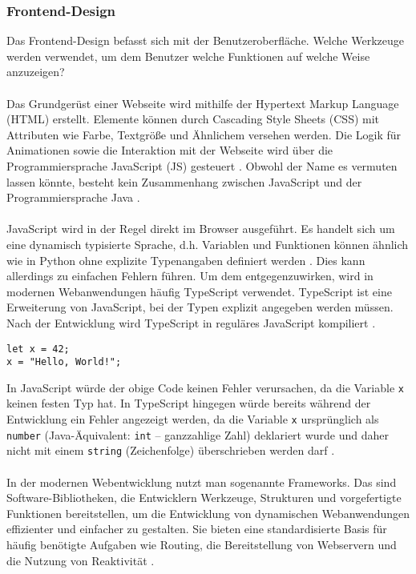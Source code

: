 \subsubsection{Frontend-Design}
Das Frontend-Design befasst sich mit der Benutzeroberfläche. Welche Werkzeuge werden verwendet, um dem Benutzer welche Funktionen auf welche Weise anzuzeigen? \parencite{mccartney-2024}\\\\
Das Grundgerüst einer Webseite wird mithilfe der Hypertext Markup Language (HTML) erstellt. Elemente können durch Cascading Style Sheets (CSS) mit Attributen wie Farbe, Textgröße und Ähnlichem versehen werden. Die Logik für Animationen sowie die Interaktion mit der Webseite wird über die Programmiersprache JavaScript (JS) gesteuert \parencite{mdn-getting-started-web}. Obwohl der Name es vermuten lassen könnte, besteht kein Zusammenhang zwischen JavaScript und der Programmiersprache Java \parencite{geeksforgeeks-2024}.\\\\
JavaScript wird in der Regel direkt im Browser ausgeführt. Es handelt sich um eine dynamisch typisierte Sprache, d.h. Variablen und Funktionen können ähnlich wie in Python ohne explizite Typenangaben definiert werden \parencite{mdn-javascript}. Dies kann allerdings zu einfachen Fehlern führen. Um dem entgegenzuwirken, wird in modernen Webanwendungen häufig TypeScript verwendet. TypeScript ist eine Erweiterung von JavaScript, bei der Typen explizit angegeben werden müssen. Nach der Entwicklung wird TypeScript in reguläres JavaScript kompiliert \parencite{typescript-tutorial-2024}.
\begin{verbatim}
let x = 42;
x = "Hello, World!";
\end{verbatim}
In JavaScript würde der obige Code keinen Fehler verursachen, da die Variable \texttt{x} keinen festen Typ hat. In TypeScript hingegen würde bereits während der Entwicklung ein Fehler angezeigt werden, da die Variable \texttt{x} ursprünglich als \texttt{number} (Java-Äquivalent: \texttt{int} – ganzzahlige Zahl) deklariert wurde und daher nicht mit einem \texttt{string} (Zeichenfolge) überschrieben werden darf \parencite{typescript-tutorial-2024}.\\\\
In der modernen Webentwicklung nutzt man sogenannte Frameworks. Das sind Software-Bibliotheken, die Entwicklern Werkzeuge, Strukturen und vorgefertigte Funktionen bereitstellen, um die Entwicklung von dynamischen Webanwendungen effizienter und einfacher zu gestalten. Sie bieten eine standardisierte Basis für häufig benötigte Aufgaben wie Routing, die Bereitstellung von Webservern und die Nutzung von Reaktivität \parencite{mdn-intro-to-cs-frameworks}.\\\\
